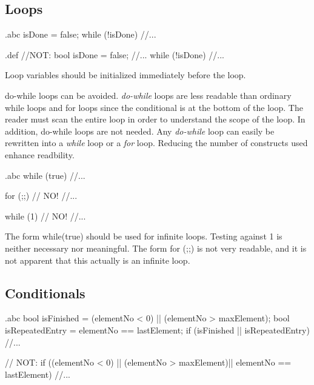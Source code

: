 \subsection{Loops}


\begin{filecontents*}{\jobname.abc}
	isDone = false;
	while (!isDone) {
		//...
	}
\end{filecontents*}

\begin{filecontents*}{\jobname.def}
	//NOT:
	bool isDone = false;
	//...
	while (!isDone) {
		//...
	}
\end{filecontents*}

\recommendation
{Loop variables should be initialized immediately before the loop.}
{
}
{}

\recommendation
{do-while loops can be avoided.}
{}
{
	\textit{do-while} loops are less readable than ordinary while loops and for loops since the conditional is at the bottom of the loop. The reader must scan the entire loop in order to understand the scope of the loop.\newline
	In addition, do-while loops are not needed. Any \textit{do-while} loop can easily be rewritten into a \textit{while} loop or a \textit{for} loop. Reducing the number of constructs used enhance readbility.
}


\begin{filecontents*}{\jobname.abc}
	while (true) {
		//...
	}

	for (;;) {  // NO!
		//...
	}

	while (1) { // NO!
		//...
	}
\end{filecontents*}

\recommendation
{The form while(true) should be used for infinite loops.}
{}
{Testing against 1 is neither necessary nor meaningful. The form for (;;) is not very readable, and it is not apparent that this actually is an infinite loop.}

\subsection{Conditionals}


\begin{filecontents*}{\jobname.abc}
	bool isFinished = (elementNo < 0) || (elementNo > maxElement);
	bool isRepeatedEntry = elementNo == lastElement;
	if (isFinished || isRepeatedEntry) {
		//...
	}
	
	// NOT:
	if ((elementNo < 0) || (elementNo > maxElement)||
	elementNo == lastElement) {
		//...
	}
\end{filecontents*}

